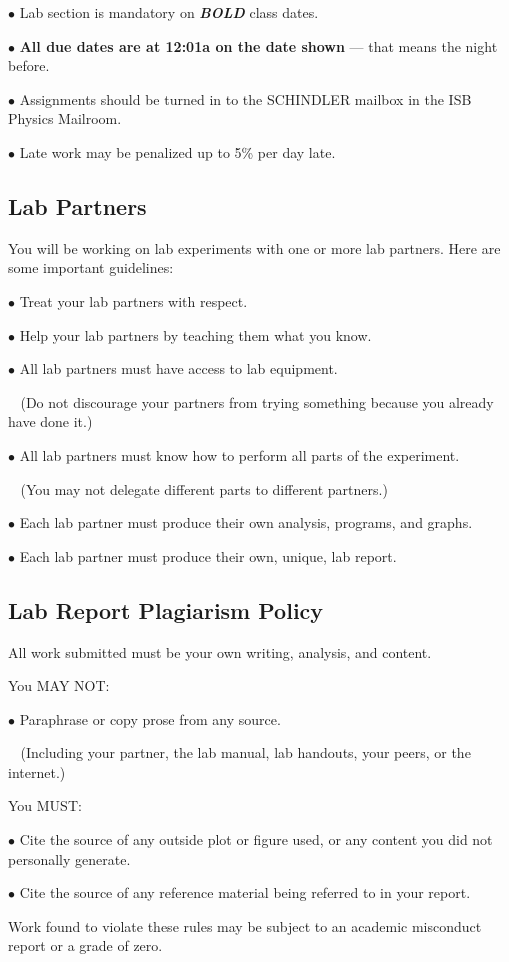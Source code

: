 \documentclass[10pt]{article}
\newcommand{\spfont}[1]{\textit{\textbf{\large #1}}}
\begin{document}
$\bullet$ Lab section is mandatory on \spfont{BOLD} class dates.

$\bullet$ \textbf{All due dates are at 12:01a on the date shown} --- that means the night before.

$\bullet$ Assignments should be turned in to the SCHINDLER mailbox in the ISB Physics Mailroom.


$\bullet$ Late work may be penalized up to 5\% per day late. 



\subsection*{Lab Partners}
You will be working on lab experiments with one or more lab partners. Here are some important guidelines:

$\bullet$ Treat your lab partners with respect.

$\bullet$ Help your lab partners by teaching them what you know.

$\bullet$ All lab partners must have access to lab equipment. 

$\;\;$ (Do not discourage your partners from trying something because you already have done it.)

$\bullet$ All lab partners must know how to perform all parts of the experiment. 

$\;\;$  (You may not delegate different parts to different partners.)

$\bullet$ Each lab partner must produce their own analysis, programs, and graphs.

$\bullet$ Each lab partner must produce their own, unique, lab report.




\subsection*{Lab Report Plagiarism Policy}
All work submitted must be your own writing, analysis, and content.

\noindent
You MAY NOT:

$\bullet$ Paraphrase or copy prose from any source.

$\;\;$ (Including your partner, the lab manual, lab handouts, your peers, or the internet.)

\noindent
You MUST:

$\bullet$ Cite the source of any outside plot or figure used, or any content you did not personally generate.

$\bullet$ Cite the source of any reference material being referred to in your report.

\noindent
Work found to violate these rules may be subject to an academic misconduct report or a grade of zero.
\end{document}

